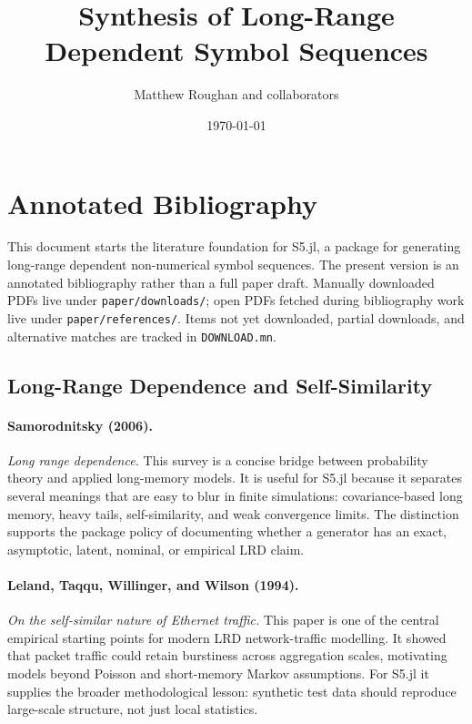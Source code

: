 \documentclass[11pt]{article}
\title{Synthesis of Long-Range Dependent Symbol Sequences}
\author{Matthew Roughan and collaborators}
\date{\today}
\begin{document}
\maketitle

\section{Annotated Bibliography}

This document starts the literature foundation for S5.jl, a package for
generating long-range dependent non-numerical symbol sequences. The present
version is an annotated bibliography rather than a full paper draft. Manually
downloaded PDFs live under \texttt{paper/downloads/}; open PDFs fetched during
bibliography work live under \texttt{paper/references/}. Items not yet
downloaded, partial downloads, and alternative matches are tracked in
\texttt{DOWNLOAD.mn}.

\subsection{Long-Range Dependence and Self-Similarity}

\paragraph{Samorodnitsky (2006).}
\emph{Long range dependence.}
This survey is a concise bridge between probability theory and applied long-memory
models. It is useful for S5.jl because it separates several meanings that are
easy to blur in finite simulations: covariance-based long memory, heavy tails,
self-similarity, and weak convergence limits. The distinction supports the
package policy of documenting whether a generator has an exact, asymptotic,
latent, nominal, or empirical LRD claim.

\paragraph{Leland, Taqqu, Willinger, and Wilson (1994).}
\emph{On the self-similar nature of Ethernet traffic.}
This paper is one of the central empirical starting points for modern LRD
network-traffic modelling. It showed that packet traffic could retain burstiness
across aggregation scales, motivating models beyond Poisson and short-memory
Markov assumptions. For S5.jl it supplies the broader methodological lesson:
synthetic test data should reproduce large-scale structure, not just local
statistics.
\end{document}
